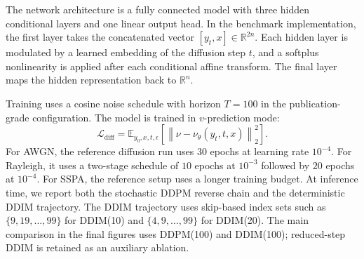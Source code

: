 The network architecture is a fully connected model with three hidden conditional layers and one linear output head.
In the benchmark implementation, the first layer takes the concatenated vector \([y_t, x] \in \mathbb{R}^{2n}\).
Each hidden layer is modulated by a learned embedding of the diffusion step \(t\), and a softplus nonlinearity is applied after each conditional affine transform.
The final layer maps the hidden representation back to \(\mathbb{R}^n\).

Training uses a cosine noise schedule with horizon \(T=100\) in the publication-grade configuration.
The model is trained in \(v\)-prediction mode:
\begin{equation}
\mathcal{L}_{\text{diff}}
=
\mathbb{E}_{y_0, x, t, \epsilon}
\left[
\left\|
\nu - \nu_\theta(y_t, t, x)
\right\|_2^2
\right].
\end{equation}
For AWGN, the reference diffusion run uses \(30\) epochs at learning rate \(10^{-4}\).
For Rayleigh, it uses a two-stage schedule of \(10\) epochs at \(10^{-3}\) followed by \(20\) epochs at \(10^{-4}\).
For SSPA, the reference setup uses a longer training budget.
At inference time, we report both the stochastic DDPM reverse chain and the deterministic DDIM trajectory.
The DDIM trajectory uses skip-based index sets such as
\( \{9,19,\ldots,99\} \) for DDIM(10) and
\( \{4,9,\ldots,99\} \) for DDIM(20).
The main comparison in the final figures uses DDPM(100) and DDIM(100); reduced-step DDIM is retained as an auxiliary ablation.

